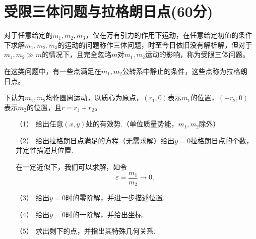 \documentclass{article}
\begin{document}
\section*{受限三体问题与拉格朗日点(60分)}
	对于任意给定的$m_1,m_2,m_3$，仅在万有引力的作用下运动，在任意给定初值的条件下求解$m_1,m_2,m_3$的运动的问题称作三体问题，时至今日依旧没有解析解，但对于$m_1,m_2\gg m$的情况下，且完全忽略$m$对$m_1,m_2$运动的影响，称为受限三体问题。\par
	在这类问题中，有一些点满足在$m_1,m_2$公转系中静止的条件，这些点称为拉格朗日点。\par
	下认为$m_1,m_2$均作圆周运动，以质心为原点，$(r_1,0)$表示$m_1$的位置，$(-r_2,0)$表示$m_2$的位置，且$r=r_1+r_2$。\par
\begin{itemize}
\item[（1）]	给出任意$(x,y)$处的有效势.（单位质量势能，$m_1,m_2$除外）
\item[（2）]	给出拉格朗日点满足的方程（无需求解）给出$y=0$拉格朗日点的个数，并定性描述其位置.\par
在一定近似下，我们可以求解，如令
$$\varepsilon=\dfrac{m_1}{m_2}\to 0.$$
\item[（3）]	给出$y=0$时的零阶解，并进一步描述位置.
\item[（4）]	给出$y=0$时的一阶解，并给出坐标.
\item[（5）]	求出剩下的点，并指出其特殊几何关系.
\end{itemize}
\end{document}
